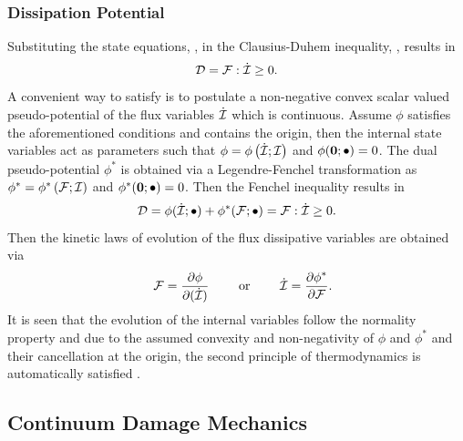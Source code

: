 \subsubsection{Dissipation Potential}
Substituting the state equations, , in the Clausius-Duhem inequality, , results in
\begin{equation}
	{\cal D}= {\cal F} : \dot{{\cal I}} \geq 0.
	\label{eq:dis_ineq}
\end{equation}
A convenient way to satisfy  is to postulate a non-negative convex scalar valued pseudo-potential of the flux variables $\dot{{\cal I}}$ which is continuous. Assume $\phi$ satisfies the aforementioned conditions and contains the origin, then the internal state variables act as parameters such that $ \phi=\phi \left(\dot{{\cal I}};{{\cal I}}  \right)$ and $\phi(\mbox{$\bm  0$};\bullet)=0$. The dual pseudo-potential
$\phi^\ast$ is obtained via a Legendre-Fenchel transformation as $ \phi^\ast=\phi^\ast \left({\cal F};{{\cal I}} \right)$ and $\phi^\ast(\mbox{$\bm  0$};\bullet)=0$. Then the Fenchel inequality results in \parencite{Bodoville2001b}
\begin{equation}
	{\cal D} = \phi ( \dot{{\cal I}};\bullet ) + \phi^\ast ( {\cal F};\bullet ) = {\cal F} : \dot{{\cal I}} \geq 0.
\end{equation}
Then the kinetic laws of evolution of the flux dissipative variables are obtained via
\begin{equation}
	\begin{split}
		\quad {\cal F}=\displaystyle\frac{\displaystyle\partial \phi}{\displaystyle\partial (\dot{{\cal I}})} \qquad \text{ or } \qquad \dot{{\cal I}} = \displaystyle\frac{\displaystyle\partial \phi^\ast}{\displaystyle\partial {\cal F}}.
	\end{split}
	\label{eq:evolution}
\end{equation}
It is seen that the evolution of the internal variables follow the normality property and due to the assumed convexity and non-negativity of $\phi$ and $\phi^\ast$ and their cancellation at the origin, the second principle of thermodynamics is automatically satisfied \parencite{lemaitre1994mechanics}.

\subsection{Continuum Damage Mechanics}
\label{sec:damage}


